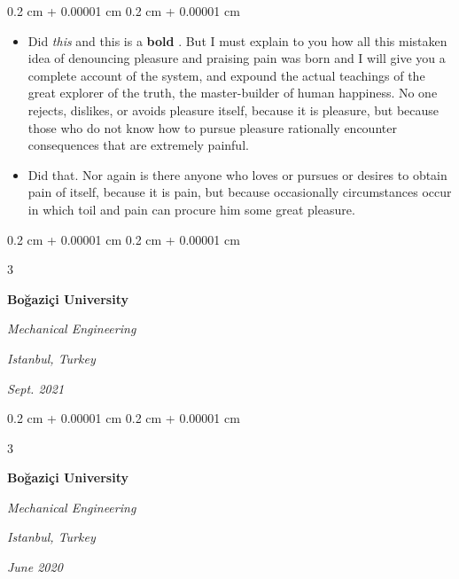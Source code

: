 \documentclass[10pt, letterpaper]{article}
\newenvironment{highlights}{
    \begin{itemize}[
        topsep=0.10 cm,
        parsep=0.10 cm,
        partopsep=0pt,
        itemsep=0pt,
        leftmargin=0.4 cm + 10pt + 0.6 cm
    ]
}{
    \end{itemize}
} %
\newenvironment{onecolentry}{
    \begin{adjustwidth}{
        0.2 cm + 0.00001 cm
    }{
        0.2 cm + 0.00001 cm
    }
}{
    \end{adjustwidth}
} %
\newenvironment{threecolentry}[3][]{
    \onecolentry
    \def\thirdColumn{#3}
    \setcolumnwidth{0.6 cm, \fill, 4.5 cm}
    \begin{paracol}{3}
    #2 \switchcolumn
}{
    \switchcolumn \raggedleft \thirdColumn
    \end{paracol}
    \endonecolentry
} %
\let\hrefWithoutArrow\href
\renewcommand{\href}[2]{\hrefWithoutArrow{#1}{\mbox{\ifthenelse{\equal{#2}{}}{ }{#2 }\raisebox{.15ex}{\footnotesize \faExternalLink*}}}}
\begin{document}
        \vspace{0.10 cm-3px}
        \begin{onecolentry}
            \begin{highlights}
                \item Did \textit{this} and this is a \textbf{bold} \href{https://example.com}{link}. But I must explain to you how all this mistaken idea of denouncing pleasure and praising pain was born and I will give you a complete account of the system, and expound the actual teachings of the great explorer of the truth, the master-builder of human happiness. No one rejects, dislikes, or avoids pleasure itself, because it is pleasure, but because those who do not know how to pursue pleasure rationally encounter consequences that are extremely painful.
                \item Did that. Nor again is there anyone who loves or pursues or desires to obtain pain of itself, because it is pain, but because occasionally circumstances occur in which toil and pain can procure him some great pleasure.
            \end{highlights}
        \end{onecolentry}


        \vspace{0.2 cm-3px}

        \begin{threecolentry}{
            \vspace*{\fill}
            \textbullet
            \vspace*{3px}
            \vspace*{\fill}
        }{
        \textit{Istanbul, Turkey}    
            
        \textit{Sept. 2021}}
            \textbf{Boğaziçi University}

            \textit{Mechanical Engineering}
        \end{threecolentry}



        \vspace{0.2 cm-3px}

        \begin{threecolentry}{
            \vspace*{\fill}
            \textbullet
            \vspace*{3px}
            \vspace*{\fill}
        }{
        \textit{Istanbul, Turkey}    
            
        \textit{June 2020}}
            \textbf{Boğaziçi University}

            \textit{Mechanical Engineering}
        \end{threecolentry}
\end{document}
